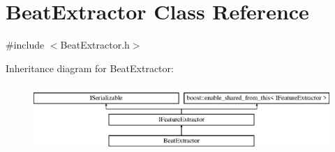 \hypertarget{class_beat_extractor}{}\section{Beat\+Extractor Class Reference}
\label{class_beat_extractor}


{\ttfamily \#include $<$Beat\+Extractor.\+h$>$}

Inheritance diagram for Beat\+Extractor\+:\begin{figure}[H]
\begin{center}
\leavevmode
\includegraphics[height=2.625000cm]{class_beat_extractor}
\end{center}
\end{figure}
